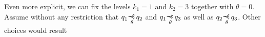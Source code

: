 \begin{exmp}
    \def\kOne{1}
    \def\kTwo{3}
    \def\zkOnepzKtwo{14} %
    \def\zkOne{2} %
    \def\zkTwo{6} %

    Even more explicit, we can fix the levels $k_1=\kOne$ and $k_2=\kTwo$ together
    with $\theta=0$.
    Assume without any restriction that $q_1\myrel{\theta}q_2$ and
    $q_1\myrel{\theta}q_3$ as well as $q_2\myrel{\theta}q_3$.
    Other choices would result 


\end{exmp}
